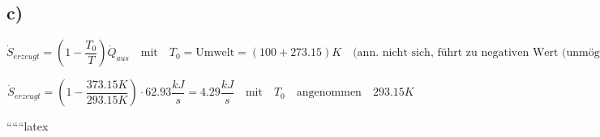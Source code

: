 

\subsection*{c)}
\[
\dot{S}_{erzeugt} = \left(1 - \frac{T_0}{T}\right) \dot{Q}_{aus} \quad \text{mit} \quad T_0 = \text{Umwelt} = (100 + 273.15) K \quad \text{(ann. nicht sich, führt zu negativen Wert (unmöglich))}
\]

\[
\dot{S}_{erzeugt} = \left(1 - \frac{373.15 K}{293.15 K}\right) \cdot 62.93 \frac{kJ}{s} = 4.29 \frac{kJ}{s} \quad \text{mit} \quad T_0 \quad \text{angenommen} \quad 293.15 K
\]

``````latex